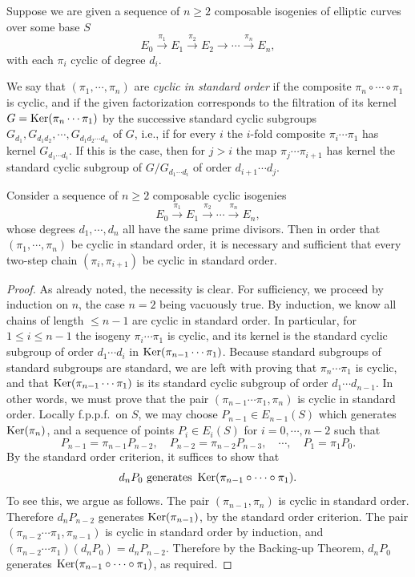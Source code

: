 \begin{pitem}\label{km:6.7.14}
Suppose we are given a sequence of $n \ge 2$ composable isogenies of elliptic curves over some base $S$
\[
E_0 \xrightarrow{\pi_1} E_1 \xrightarrow{\pi_2} E_2 \longrightarrow \cdots \xrightarrow{\pi_n} E_n,
\]
with each $\pi_i$ cyclic of degree $d_i$.

We say that $(\pi_1, \cdots, \pi_n)$ are \emph{cyclic in standard order} if the composite $\pi_n \circ \cdots \circ \pi_1$ is cyclic, and if the given factorization corresponds to the filtration of its kernel $G = \operatorname{Ker}(\pi_n \cdots \pi_1)$ by the successive standard cyclic subgroups $G_{d_1}, G_{d_1d_2}, \cdots, G_{d_1d_2\cdots d_n}$ of $G$, i.e., if for every $i$ the $i$-fold composite $\pi_i \cdots \pi_1$ has kernel $G_{d_1\cdots d_i}$. If this is the case, then for $j > i$ the map $\pi_j \cdots \pi_{i+1}$ has kernel the standard cyclic subgroup of $G/G_{d_1\cdots d_i}$ of order $d_{i+1}\cdots d_j$.
\end{pitem}

\begin{kthm}\label{thm:6.7.15}
Consider a sequence of $n \ge 2$ composable cyclic isogenies
\[
E_0 \xrightarrow{\pi_1} E_1 \xrightarrow{\pi_2} \cdots \xrightarrow{\pi_n} E_n,
\]
whose degrees $d_1, \cdots, d_n$ all have the same prime divisors. Then in order that $(\pi_1, \cdots, \pi_n)$ be cyclic in standard order, it is necessary and sufficient that every two-step chain $(\pi_i, \pi_{i+1})$ be cyclic in standard order.
\end{kthm}

\begin{proof}
As already noted, the necessity is clear. For sufficiency, we proceed by induction on $n$, the case $n = 2$ being vacuously true. By induction, we know all chains of length $\le n-1$ are cyclic in standard order. In particular, for $1 \le i \le n-1$ the isogeny $\pi_i \cdots \pi_1$ is cyclic, and its kernel is the standard cyclic subgroup of order $d_1 \cdots d_i$ in $\operatorname{Ker}(\pi_{n-1} \cdots \pi_1)$. Because standard subgroups of standard subgroups are standard, we are left with proving that $\pi_n \cdots \pi_1$ is cyclic, and that $\operatorname{Ker}(\pi_{n-1} \cdots \pi_1)$ is its standard cyclic subgroup of order $d_1 \cdots d_{n-1}$. In other words, we must prove that the pair $(\pi_{n-1} \cdots \pi_1, \pi_n)$ is cyclic in standard order. Locally f.p.p.f.\ on $S$, we may choose $P_{n-1} \in E_{n-1}(S)$ which generates $\operatorname{Ker}(\pi_n)$, and a sequence of points $P_i \in E_i(S)$ for $i = 0, \cdots, n-2$ such that
\[
P_{n-1} = \pi_{n-1}P_{n-2}, \quad P_{n-2} = \pi_{n-2}P_{n-3}, \quad \cdots, \quad P_1 = \pi_1P_0 .
\]
By the standard order criterion, it suffices to show that
\[
d_nP_0 \text{ generates } \operatorname{Ker}(\pi_{n-1} \circ \cdots \circ \pi_1) .
\]
To see this, we argue as follows. The pair $(\pi_{n-1},\pi_n)$ is cyclic in standard order. Therefore $d_nP_{n-2}$ generates $\operatorname{Ker}(\pi_{n-1})$, by the standard order criterion. The pair $(\pi_{n-2} \cdots \pi_1, \pi_{n-1})$ is cyclic in standard order by induction, and $(\pi_{n-2} \cdots \pi_1)(d_nP_0) = d_nP_{n-2}$. Therefore by the Backing-up Theorem, $d_nP_0$ generates $\operatorname{Ker}(\pi_{n-1} \circ \cdots \circ \pi_1)$, as required.
\end{proof}

